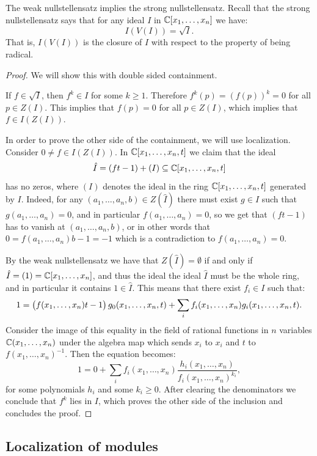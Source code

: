 \documentclass[11pt,a4paper]{article}
\begin{document}
\begin{proposition}
  The weak nullstellensatz implies the strong nullstellensatz.
  Recall that the strong nullstellensatz says that
  for any ideal $I$ in $\mathbb{C}[x_1,\dots,x_n]$ we have:
  \[
    I(V(I)) = \sqrt{I}.
  \]
  That is, $I(V(I))$ is the closure of $I$ with respect to the property
  of being radical.
\end{proposition}
\begin{proof}
  We will show this with double sided containment.

  If $f \in \sqrt{I}$,
  then $f^k \in I$ for some $k \geq 1$.
  Therefore $f^k(p) = (f(p))^k = 0$ for all $p \in Z(I)$.
  This implies that $f(p) = 0$ for all $p \in Z(I)$,
  which implies that $f \in I(Z(I))$.

  In order to prove the other side of the containment,
  we will use localization.
  Consider $0 \neq f \in I(Z(I))$.
  In $\mathbb{C}[x_1,\dots,x_n,t]$ we claim that the ideal
  \[
    \hat I = (ft - 1) + (I) \subseteq \mathbb{C}[x_1,\dots,x_n,t]
  \]
  has no zeros, where $(I)$ denotes the ideal in the ring $\mathbb{C}[x_1,\dots,x_n,t]$
  generated by $I$.
  Indeed, for any $(a_1,\dots,a_n,b) \in Z(\hat I)$
  there must exist $g \in I$ such that $g(a_1,\dots,a_n) = 0$,
  and in particular $f(a_1,\dots,a_n) = 0$,
  so we get that $(ft - 1)$ has to vanish at $(a_1,\dots,a_n,b)$,
  or in other words that $0 = f(a_1,\dots,a_n) b - 1 = -1$
  which is a contradiction to $f(a_1,\dots,a_n) = 0$.
  
  By the weak nullstellensatz we have that
  $Z(\hat I) = \emptyset$ if and only if $\hat I = (1) = \mathbb{C}[x_1,\dots,x_n]$,
  and thus the ideal the ideal $\hat I$ must be the whole
  ring, and in particular it contains $1 \in \hat I$.
  This means that there exist $f_i \in I$ such that:
  \[
    1 =
    \del{f(x_1,\dots,x_n) t - 1} g_0(x_1,\dots,x_n,t) +
    \sum_{i} f_i(x_1,\dots,x_n) g_i(x_1,\dots,x_n,t).
  \]
  Consider the image of this equality in the field of rational
  functions in $n$ variables $\mathbb{C}(x_1,\dots,x_n)$ under the algebra map
  which sends $x_i$ to $x_i$ and $t$ to $f(x_1,\dots,x_n)^{-1}$.
  Then the equation becomes:
  \[
    1 =
    0 +
    \sum_{i} f_i(x_1,\dots,x_n) \frac{h_i(x_1,\dots,x_n)}{f_i(x_1,\dots,x_n)^{k_i}},
  \]
  for some polynomials $h_i$ and some $k_i \geq 0$.
  After clearing the denominators we conclude that $f^k$ lies in $I$,
  which proves the other side of the inclusion and concludes the proof.
\end{proof}

\subsection{Localization of modules}
\end{document}
